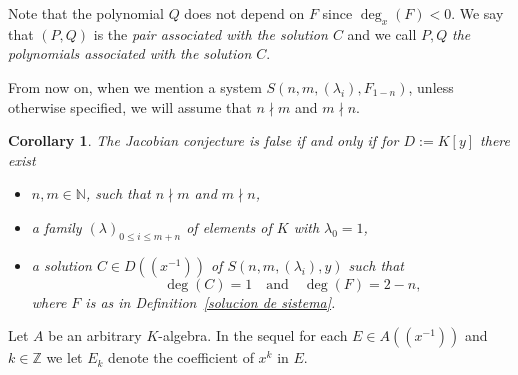 \documentclass[reqno,a4paper]{amsart}
\newtheorem{corollary}[theorem]{Corollary}
\theoremstyle{definition}
\theoremstyle{remark}
\begin{document}
Note that the polynomial $Q$ does not depend on $F$ since $\deg_x(F)\!<0$. We say that $(P,Q)$
is the {\em pair associated with the solution $C$} and we call $P,Q$ {\em the po\-ly\-no\-mials
associated with the solution $C$}.

\smallskip

From now on, when we mention a system $S(n,m,(\lambda_i),F_{1-n})$, unless otherwise specified,
we will assume that $n\nmid m$ and $m\nmid n$.

\begin{corollary}\label{corolario} The Jacobian conjecture is false if and only if for $D:=K[y]$
there exist

\begin{itemize}

\smallskip

\item[-] $n,m\in \mathds{N}$, such that $n\nmid m$ and $m\nmid n$,

\smallskip

\item[-] a family $(\lambda)_{0\le i \le m+n}$ of elements of $K$ with $\lambda_0=1$,

\smallskip

\item[-] a solution $C\in D((x^{-1}))$ of $S(n,m,(\lambda_i),y)$ such that
$$
\qquad\quad \deg(C) = 1\quad\text{and}\quad \deg(F) = 2-n,
$$
where $F$ is as in Definition~\ref{solucion de sistema}.

\smallskip

\end{itemize}
\end{corollary}

Let $A$ be an arbitrary $K$-algebra. In the sequel for each $E\!\in\! A((x^{-1}))$ and
$k\!\in\! \mathds{Z}$ we let $E_k$ denote the coefficient of $x^k$ in $E$.
\end{document}
